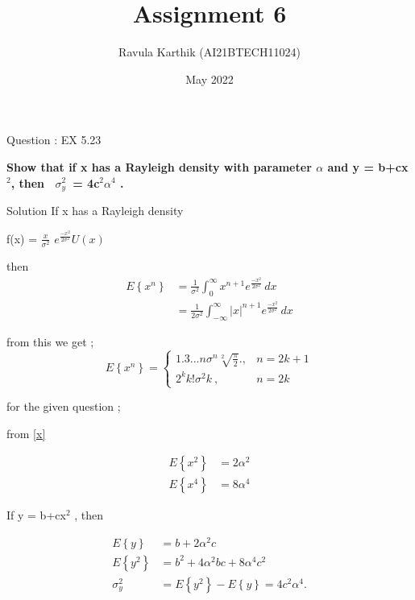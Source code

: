 \documentclass[journal,12pt,twocolumn]{beamer}
\title{Assignment 6}
\author{Ravula Karthik (AI21BTECH11024)}
\date {May 2022}
\providecommand{\cbrak}[1]{\ensuremath{\left\{#1\right\}}}
\begin{document}
	\begin{frame}
		\titlepage 
	\end{frame}
	
	\begin{frame}{Question : EX 5.23}
		
		\textbf{Show that if x has a Rayleigh density with parameter $\alpha$ and  y = b+cx$^2$, then {\ $\sigma_y^2$\ }= 4c$^2$$\alpha^4$ .
		}
	\end{frame}
	\begin{frame}{Solution}
		 If x has a Rayleigh density 
		
		f(x) = $\frac{x}{\sigma^2}$ $e^\frac{-x^2}{2\sigma^2} U(x) $
		
		then
		\begin{align}
			E\cbrak{x^n}  &= \frac{1}{\sigma^2} \int_{0}^{\infty} x^{n+1}e^\frac{-x^2}{2\sigma^2} \,dx \\
			&=\frac{1}{2\sigma^2} \int_{-\infty}^{\infty} |x|^{n+1}e^\frac{-x^2}{2\sigma^2} \,dx
		\end{align}	
	\end{frame}

	\begin{frame}
		
		from this we get ;
		\begin{equation} 
			E\cbrak{x^n}  = \begin{cases}
				1.3...n\sigma^n\sqrt[2]{\frac{\pi}{2}}.,  & n = 2k + 1 \\
				2^k k! \sigma^2k\ , & n = 2k \label{x}
			\end{cases}
		\end{equation}  
	\end{frame}
	
	
	\begin{frame}
		for the given question ;
		
		from \eqref{x}
		
		\begin{align}
			E\cbrak{x^2} &= 2\alpha^2  	\\
			E\cbrak{x^4} &= 8\alpha^4 
		\end{align}
		
		If y = b+cx$^2$ , then
		
		\begin{align}
			E\cbrak{y} &= b + 2\alpha^2 c	\\
			E\cbrak{y^2} &= b^2 + 4\alpha^2bc + 8\alpha^4 c^2 \\
			\sigma_y ^2 &= E\cbrak{y^2} - E\cbrak{y} = 4c^2\alpha^4 .
		\end{align}
	\end{frame}
	
	
\end{document}
